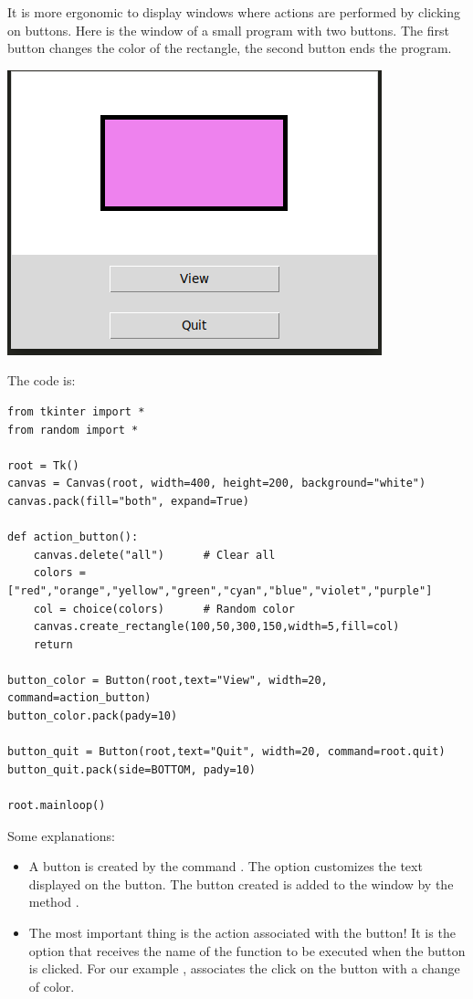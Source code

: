 \documentclass[11pt,class=report,crop=false]{standalone}
\begin{document}
\begin{cours}


It is more ergonomic to display windows where actions are performed by clicking on buttons.
Here is the window of a small program with two buttons. The first button changes the color of the rectangle, the second button ends the program.
\begin{center}
\includegraphics[scale=\myscale,scale=0.6]{screen-stat-lesson-buttons-en}
\end{center}

The code is:
\begin{lstlisting}
from tkinter import *
from random import *

root = Tk()     
canvas = Canvas(root, width=400, height=200, background="white")
canvas.pack(fill="both", expand=True)

def action_button():
    canvas.delete("all")      # Clear all
    colors = ["red","orange","yellow","green","cyan","blue","violet","purple"]
    col = choice(colors)      # Random color
    canvas.create_rectangle(100,50,300,150,width=5,fill=col)
    return

button_color = Button(root,text="View", width=20, command=action_button)
button_color.pack(pady=10)

button_quit = Button(root,text="Quit", width=20, command=root.quit)
button_quit.pack(side=BOTTOM, pady=10)

root.mainloop()
\end{lstlisting}

Some explanations:
\begin{itemize}
  \item A button is created by the command . The  option customizes the text displayed on the button. The button created is added to the window by the method .
  \item The most important thing is the action associated with the button! It is the option  that receives the name of the function to be executed when the button is clicked. For our example , associates the click on the button with a change of color.
  

\end{itemize}
\end{cours}
\end{document}
